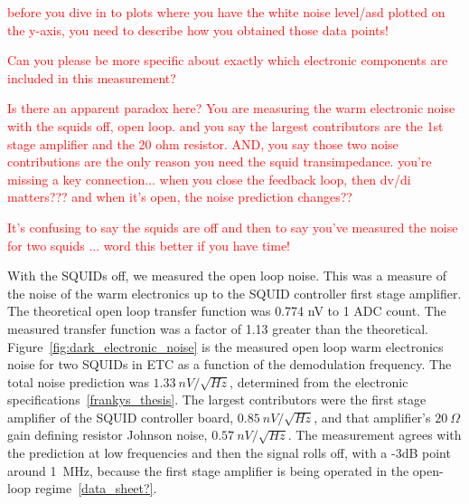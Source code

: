 \textcolor{red}{before you dive in to plots where you have the white noise level/asd plotted on the y-axis, you need to describe how you obtained those data points!}

\textcolor{red}{Can you please be more specific about exactly which electronic components are included in this measurement?}

\textcolor{red}{Is there an apparent paradox here? You are measuring the warm electronic noise with the squids off, open loop. and you say the largest contributors are the 1st stage amplifier and the 20 ohm resistor. AND, you say those two noise contributions are the only reason you need the squid transimpedance. you're missing a key connection... when you close the feedback loop, then dv/di matters??? and when it's open, the noise prediction changes??}

\textcolor{red}{It's confusing to say the squids are off and then to say you've measured the noise for two squids ... word this better if you have time!}


With the \ac{SQUID}s off, we measured the open loop noise.
This was a measure of the noise of the warm electronics up to the \ac{SQUID} controller first stage amplifier. 
The theoretical open loop transfer function was 0.774 nV to 1 \ac{ADC} count. 
The measured transfer function was a factor of 1.13 greater than the theoretical. 
Figure~\ref{fig:dark_electronic_noise} is the measured open loop warm electronics noise for two \ac{SQUID}s in \ac{ETC} as a function of the demodulation frequency. 
The total noise prediction was $1.33~nV/\sqrt{Hz}$, determined from the electronic specifications~\ref{frankys_thesis}. 
The largest contributors were the first stage amplifier of the \ac{SQUID} controller board, $0.85~nV/\sqrt{Hz}$, and that amplifier's $20~\Omega$ gain defining resistor Johnson noise, $0.57~nV/\sqrt{Hz}$. 
The measurement agrees with the prediction at low frequencies and then the signal rolls off, with a -3dB point around 1~MHz, because the first stage amplifier is being operated in the open-loop regime~\ref{data_sheet?}.  

